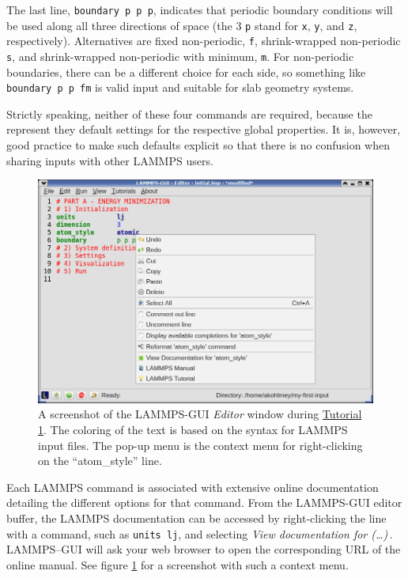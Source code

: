 \documentclass[9pt,tutorial]{livecoms}
\newcommand{\lmpcmd}[1]{\hspace{0pt}\colorbox{listing}{\textcolor{command}{\texttt{#1}}}\hspace{0pt}} %
\begin{document}
The last line, \lmpcmd{boundary p p p}, indicates that periodic boundary
conditions will be used along all three directions of space (the 3
\lmpcmd{p} stand for \lmpcmd{x}, \lmpcmd{y}, and \lmpcmd{z},
respectively).  Alternatives are fixed non-periodic, \lmpcmd{f},
shrink-wrapped non-periodic \lmpcmd{s}, and shrink-wrapped non-periodic
with minimum, \lmpcmd{m}.  For non-periodic boundaries, there can be a
different choice for each side, so something like \lmpcmd{boundary p p
  fm} is valid input and suitable for slab geometry systems.

Strictly speaking, neither of these four commands are required, because
the represent they default settings for the respective global properties.
It is, however, good practice to make such defaults explicit so that
there is no confusion when sharing inputs with other LAMMPS users.

\begin{figure}
\centering
\includegraphics[width=\linewidth]{GUI-1.png}
\caption{A screenshot of the LAMMPS-GUI \textit{Editor} window during
  \hyperref[lennard-jones-label]{Tutorial 1}. The coloring of the text
  is based on the syntax for LAMMPS input files.  The pop-up menu is the
  context menu for right-clicking on the ``atom\_style'' line.}
\label{fig:GUI-1}
\end{figure}

Each LAMMPS command is associated with extensive online documentation
detailing the different options for that command.  From the LAMMPS-GUI
editor buffer, the LAMMPS documentation can be accessed by
right-clicking the line with a command, such as \lmpcmd{units lj}, and
selecting \textit{View documentation for (\dots)}\,.  LAMMPS--GUI will
ask your web browser to open the corresponding URL of the online manual.
See figure \ref{fig:GUI-1} for a screenshot with such a context menu.
\end{document}
